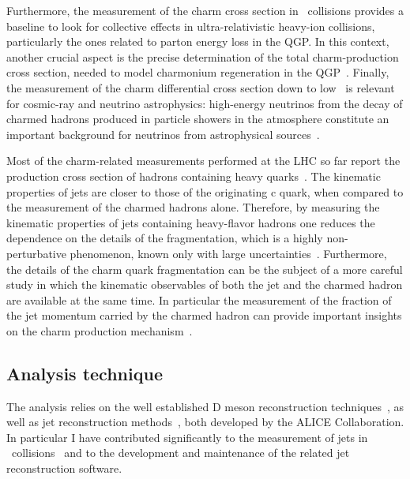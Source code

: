 \documentclass[12pt, a4paper, twoside, titlepage]{article}
\begin{document}
Furthermore, the measurement of the charm cross section in \pp\ collisions provides a baseline to look for collective effects in ultra-relativistic
heavy-ion collisions, particularly the ones related to parton energy loss in the QGP. In this context, another crucial aspect is the precise determination of the
total charm-production cross section, needed to model charmonium regeneration in the QGP~\cite{Zhao:2011}.
Finally, the measurement of the charm differential cross section down to low \pt\ is relevant for cosmic-ray and neutrino
astrophysics: high-energy neutrinos from the decay of charmed hadrons produced in particle showers in the atmosphere constitute an important
background for neutrinos from astrophysical sources~\cite{Gauld:2015, Bhattacharya:2015}.

Most of the charm-related measurements performed at the LHC so far report the production cross section of hadrons
containing heavy quarks~\cite{ALICE:2012d, ALICE:2012e, ATLAS:2012e, LHCb:2013a, ALICE:2014d, ATLAS:2014e, ALICE:2015c, ALICE:2015d, ALICE:2016a, ATLAS:2016a}.
The kinematic properties of jets are closer to those of the originating c quark, when compared to the measurement of the charmed hadrons alone.
Therefore, by measuring the kinematic properties of jets containing heavy-flavor hadrons 
one reduces the dependence on the details of the fragmentation, which is a highly non-perturbative phenomenon, known only with large uncertainties~\cite{dEnterria:2014}.
Furthermore, the details of the charm quark fragmentation can be the subject of a more careful study in which the kinematic observables 
of both the jet and the charmed hadron are available at the same time. In particular the measurement of the fraction of the jet momentum carried 
by the charmed hadron can provide important insights on the charm production mechanism~\cite{CDF:1990, UA1:1990, STAR:2009a, ATLAS:2012d}.

\subsection{Analysis technique}
The analysis relies on the well established D meson reconstruction techniques~\cite{ALICE:2012d, ALICE:2012e, ALICE:2014d, ALICE:2015c, ALICE:2015d, ALICE:2016a}, as well as
jet reconstruction methods~\cite{ALICE:2013c, ALICE:2014a, ALICE:2015e, ALICE:2015f}, both developed by the ALICE Collaboration. In particular I have
contributed significantly to the measurement of jets in \PbPb\ collisions~\cite{ALICE:2015a, Aiola:2013, Aiola:2014} and to the
development and maintenance of the related jet reconstruction software.
\end{document}
